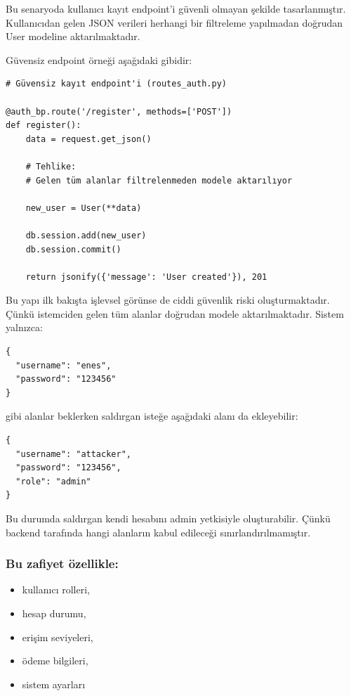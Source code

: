 Bu senaryoda kullanıcı kayıt endpoint’i güvenli olmayan şekilde tasarlanmıştır. Kullanıcıdan gelen JSON verileri herhangi bir filtreleme yapılmadan doğrudan User modeline aktarılmaktadır.

Güvensiz endpoint örneği aşağıdaki gibidir:

\begin{lstlisting}
# Güvensiz kayıt endpoint'i (routes_auth.py)

@auth_bp.route('/register', methods=['POST'])
def register():
    data = request.get_json()

    # Tehlike:
    # Gelen tüm alanlar filtrelenmeden modele aktarılıyor

    new_user = User(**data)

    db.session.add(new_user)
    db.session.commit()

    return jsonify({'message': 'User created'}), 201
\end{lstlisting}

Bu yapı ilk bakışta işlevsel görünse de ciddi güvenlik riski oluşturmaktadır. Çünkü istemciden gelen tüm alanlar doğrudan modele aktarılmaktadır. Sistem yalnızca:

\begin{lstlisting}
{
  "username": "enes",
  "password": "123456"
}
\end{lstlisting}

gibi alanlar beklerken saldırgan isteğe aşağıdaki alanı da ekleyebilir:

\begin{lstlisting}
{
  "username": "attacker",
  "password": "123456",
  "role": "admin"
}
\end{lstlisting}

Bu durumda saldırgan kendi hesabını admin yetkisiyle oluşturabilir. Çünkü backend tarafında hangi alanların kabul edileceği sınırlandırılmamıştır.

\subsubsection{Bu zafiyet özellikle:}

\begin{itemize}[leftmargin=*]
    \item kullanıcı rolleri,
    \item hesap durumu,
    \item erişim seviyeleri,
    \item ödeme bilgileri,
    \item sistem ayarları
\end{itemize}

